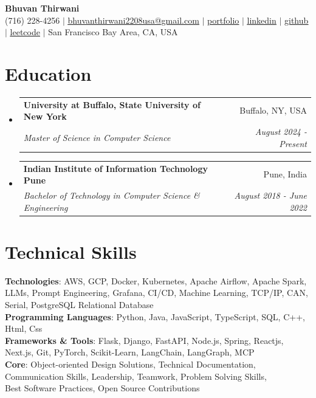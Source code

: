 \documentclass[letterpaper,10pt]{report}
\makeatletter
\newcommand{\resumeEducationSubheading}[4]{
  \vspace{-2pt}\item
    \begin{tabular*}{0.97\textwidth}[t]{l@{\extracolsep{\fill}}r}
      \textbf{#1} & #2 \\
      \textit{\small#3} & \textit{\small #4} \\
    \end{tabular*}\vspace{-7pt}
}
\newcommand{\resumeSubHeadingListStart}{\begin{itemize}[leftmargin=0.15in, label={}]}
\newcommand{\resumeSubHeadingListEnd}{\end{itemize}}
\makeatother
\begin{document}
\vspace{-50pt}
\begin{center}

    \textbf{\Huge Bhuvan Thirwani} \\ \vspace{1pt}
    (716) 228-4256 $|$ \href{mailto:bhuvanthirwani2208usa@gmail.com}{\underline{bhuvanthirwani2208usa@gmail.com}} $|$
    \href{http://portfolio.haxcodes.dev}
    {\underline{portfolio}} $|$
    \href{http://www.linkedin.com/in/dev-hax-codes}
    {\underline{linkedin}} $|$
    \href{https://github.com/bhuvanthirwani}
    {\underline{github}} $|$
    \href{http://www.leetcode.com/bhuvanthirwani}
    {\underline{leetcode}} $|$
    {San Francisco Bay Area, CA, USA}
\end{center}

\section{Education}
  \resumeSubHeadingListStart
   \resumeEducationSubheading
      {University at Buffalo, State University of New York}{Buffalo, NY, USA}
      {Master of Science in Computer Science}{August 2024 - Present}
    \resumeEducationSubheading
      {Indian Institute of Information Technology Pune}{Pune, India}
      {Bachelor of Technology in Computer Science \& Engineering}{August 2018 - June 2022}
  \resumeSubHeadingListEnd

\section{Technical Skills}
 \begin{itemize}[leftmargin=0.05in, label={}]
    \small{
        \item{
     \textbf{Technologies}{: AWS, GCP, Docker, Kubernetes, Apache Airflow, Apache Spark, LLMs, Prompt Engineering, Grafana, CI/CD, Machine Learning, TCP/IP, CAN, Serial, PostgreSQL Relational Database} \\ \textbf{Programming Languages}{: Python, Java, JavaScript, TypeScript, SQL, C++, Html, Css} \\ \textbf{Frameworks \& Tools}{: Flask, Django, FastAPI, Node.js, Spring, Reactjs, Next.js, Git, PyTorch, Scikit-Learn, LangChain, LangGraph, MCP} \\ \textbf{Core}{: Object-oriented Design Solutions, Technical Documentation, Communication Skills, Leadership, Teamwork, Problem Solving Skills, \\ Best Software Practices, Open Source Contributions}
    }
    }
  
 \end{itemize}
\end{document}
